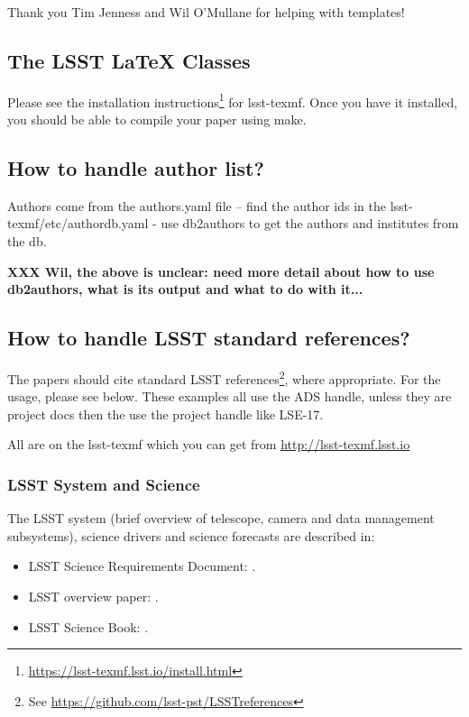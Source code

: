 Thank you Tim Jenness and Wil O'Mullane for helping with templates! 

\subsection{The LSST LaTeX Classes}

Please see the installation instructions\footnote{\url{https://lsst-texmf.lsst.io/install.html}} 
for lsst-texmf. Once you have it installed, you should be able to compile your paper
using make. 

\subsection{How to handle author list?} 

Authors come from the authors.yaml file --  find the author ids in the lsst-texmf/etc/authordb.yaml - use db2authors to get the authors and institutes from the db. 

{\bf XXX Wil, the above is unclear: need more detail about how to use db2authors,
what is its output and what to do with it...} 


\subsection{How to handle LSST standard references?} 

The papers should cite standard LSST references\footnote{See \url{https://github.com/lsst-pst/LSSTreferences}}, 
where appropriate. For the usage, please see below.  These examples all use the ADS handle, unless they are 
project docs then the use the project handle like LSE-17.

All are on the lsst-texmf which you can get from \url{http://lsst-texmf.lsst.io}


\subsubsection{LSST System and Science}

The LSST system (brief overview of telescope, camera and data management subsystems),
science drivers and science forecasts are described in:

\begin{itemize}
\item LSST Science Requirements Document: \cite{LPM-17}.
\item LSST overview paper: \cite{2008arXiv0805.2366I}.
\item LSST Science Book: \cite{abell2009lsst}.
\end{itemize}


